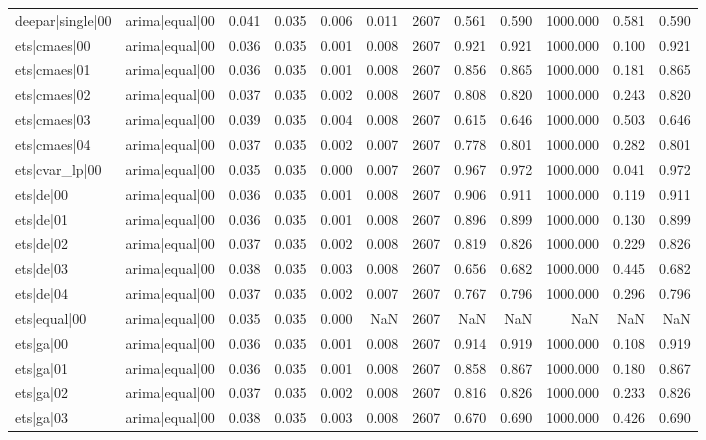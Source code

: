 \begin{table}
\begin{tabular}{llrrrrrrrrrr}
deepar|single|00 & arima|equal|00 & 0.041 & 0.035 & 0.006 & 0.011 & 2607 & 0.561 & 0.590 & 1000.000 & 0.581 & 0.590 \\
ets|cmaes|00 & arima|equal|00 & 0.036 & 0.035 & 0.001 & 0.008 & 2607 & 0.921 & 0.921 & 1000.000 & 0.100 & 0.921 \\
ets|cmaes|01 & arima|equal|00 & 0.036 & 0.035 & 0.001 & 0.008 & 2607 & 0.856 & 0.865 & 1000.000 & 0.181 & 0.865 \\
ets|cmaes|02 & arima|equal|00 & 0.037 & 0.035 & 0.002 & 0.008 & 2607 & 0.808 & 0.820 & 1000.000 & 0.243 & 0.820 \\
ets|cmaes|03 & arima|equal|00 & 0.039 & 0.035 & 0.004 & 0.008 & 2607 & 0.615 & 0.646 & 1000.000 & 0.503 & 0.646 \\
ets|cmaes|04 & arima|equal|00 & 0.037 & 0.035 & 0.002 & 0.007 & 2607 & 0.778 & 0.801 & 1000.000 & 0.282 & 0.801 \\
ets|cvar\_lp|00 & arima|equal|00 & 0.035 & 0.035 & 0.000 & 0.007 & 2607 & 0.967 & 0.972 & 1000.000 & 0.041 & 0.972 \\
ets|de|00 & arima|equal|00 & 0.036 & 0.035 & 0.001 & 0.008 & 2607 & 0.906 & 0.911 & 1000.000 & 0.119 & 0.911 \\
ets|de|01 & arima|equal|00 & 0.036 & 0.035 & 0.001 & 0.008 & 2607 & 0.896 & 0.899 & 1000.000 & 0.130 & 0.899 \\
ets|de|02 & arima|equal|00 & 0.037 & 0.035 & 0.002 & 0.008 & 2607 & 0.819 & 0.826 & 1000.000 & 0.229 & 0.826 \\
ets|de|03 & arima|equal|00 & 0.038 & 0.035 & 0.003 & 0.008 & 2607 & 0.656 & 0.682 & 1000.000 & 0.445 & 0.682 \\
ets|de|04 & arima|equal|00 & 0.037 & 0.035 & 0.002 & 0.007 & 2607 & 0.767 & 0.796 & 1000.000 & 0.296 & 0.796 \\
ets|equal|00 & arima|equal|00 & 0.035 & 0.035 & 0.000 & NaN & 2607 & NaN & NaN & NaN & NaN & NaN \\
ets|ga|00 & arima|equal|00 & 0.036 & 0.035 & 0.001 & 0.008 & 2607 & 0.914 & 0.919 & 1000.000 & 0.108 & 0.919 \\
ets|ga|01 & arima|equal|00 & 0.036 & 0.035 & 0.001 & 0.008 & 2607 & 0.858 & 0.867 & 1000.000 & 0.180 & 0.867 \\
ets|ga|02 & arima|equal|00 & 0.037 & 0.035 & 0.002 & 0.008 & 2607 & 0.816 & 0.826 & 1000.000 & 0.233 & 0.826 \\
ets|ga|03 & arima|equal|00 & 0.038 & 0.035 & 0.003 & 0.008 & 2607 & 0.670 & 0.690 & 1000.000 & 0.426 & 0.690 \\

\end{tabular}
\end{table}
